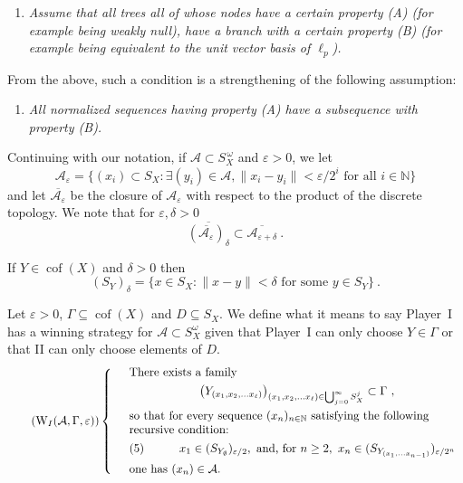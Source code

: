 \documentclass[11pt,leqno]{amsart}
\theoremstyle{definition}
\newcommand{\vp}{\varepsilon}
\newcommand{\cof}{\operatorname{cof}}
\newcommand{\cA}{\mathcal{A}}
\newcommand{\bcAvp}{\overline{\mathcal{A_\vp}}}
\newcommand{\N}{\mathbb{N}}
\begin{document}
\begin{enumerate}
\item[]
{\em Assume that all trees all of whose nodes have a certain property (A) 
(for example being weakly null), have a branch
with a certain property (B) (for example being equivalent to 
the unit vector basis of $\ell_p$).}
\end{enumerate}
{From} the above,  such a  condition is a strengthening of the 
following assumption:
\begin{enumerate}
\item[]
{\em All normalized  sequences  having property (A) have a 
subsequence with property (B).} 
\end{enumerate}
   
  
Continuing with our notation, 
if $\cA\subset S^{\,\omega}_X$ and $\vp>0$, we let 
$$\cA_\vp=\bigl\{(x_i)\subset S_X:\exists (y_i)\in\cA, \|x_i-y_i\|<\vp/2^i 
\text{ for all } i\in\N\bigr\}$$
and let $\bcAvp$ be the closure of $\cA_\vp$  with respect to the product 
of the discrete topology.
We note that for $\vp,\delta >0$ 
\begin{equation}\label{E4}
\overline{(\bcAvp)_\delta}\subset\overline{\cA_{\vp+\delta}}\ .
\end{equation}
  
If $Y\in \cof (X)$ and $\delta >0$ then 
$$(S_Y)_\delta = \{x\in S_X :\|x-y\| <\delta \text{ for some } 
y\in S_Y\}\ .$$

Let $\vp >0$, $\Gamma \subseteq \cof (X)$ and $D\subseteq S_X$. 
We define what it means to say Player~I has a winning strategy 
for $\cA\subset S_X^\omega$ given that Player~I 
can only choose $Y\in\Gamma$ or that II can only choose elements of $D$.
\begin{equation}\tag*{$(\text{W}_I(\cA,\Gamma,\vp))$} 
\left\{ \begin{array}{cl} 
&\text{There exists a family}\\
\noalign{\vskip4pt}
&\qquad\qquad\qquad 
\bigl(Y_{(x_1,x_2,\ldots x_\ell)}\bigr)_{(x_1,x_2,\ldots x_\ell)
\in\bigcup_{j=0}^\infty S^j_X}\subset\Gamma\ ,\\
\noalign{\vskip4pt}
&\text{so that for every sequence $(x_n)_{n\in\N}$ satisfying the following}\\ 
&\text{recursive condition:}\\
\noalign{\vskip4pt}
&(5)\qquad\quad x_1\in (S_{Y_\emptyset})_{\vp/2}, \text{ and, for }n\ge 2,
\ x_n\in (S_{Y_{(x_1,\ldots x_{n-1})}})_{\vp/2^n}\\
\noalign{\vskip4pt}
&\text{one has $(x_n)\in\cA$.}
\end{array} \right.
\end{equation}
\addtocounter{equation}{1}
          
\end{document}
